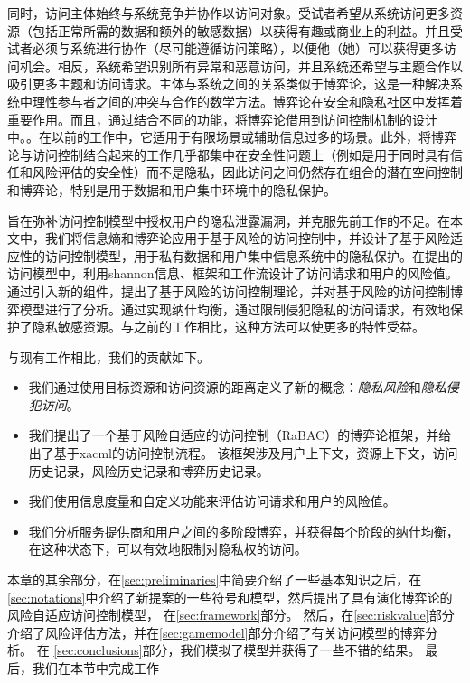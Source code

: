 同时，访问主体始终与系统竞争并协作以访问对象。受试者希望从系统访问更多资源（包括正常所需的数据和额外的敏感数据）以获得有趣或商业上的利益。并且受试者必须与系统进行协作（尽可能遵循访问策略），以便他（她）可以获得更多访问机会。相反，系统希望识别所有异常和恶意访问，并且系统还希望与主题合作以吸引更多主题和访问请求。主体与系统之间的关系类似于博弈论\cite{nash1950}，这是一种解决系统中理性参与者之间的冲突与合作的数学方法。博弈论在安全和隐私社区中发挥着重要作用\cite{do2017,zhu2018,tian2019}。而且，通过结合不同的功能，将博弈论借用到访问控制机制的设计中。\cite{hu2014,zhang2015,liu2016,gao2018, helil2017}。在以前的工作中，它适用于有限场景\cite{hu2014,gao2018}或辅助信息过多的场景\cite{zhang2015,liu2016,helil2017}。此外，将博弈论与访问控制结合起来的工作几乎都集中在安全性问题上（例如\cite{helil2017}是用于同时具有信任和风险评估的安全性）而不是隐私，因此访问之间仍然存在组合的潜在空间控制和博弈论，特别是用于数据和用户集中环境中的隐私保护。

旨在弥补访问控制模型中授权用户的隐私泄露漏洞，并克服先前工作的不足。在本文中，我们将信息熵和博弈论应用于基于风险的访问控制中，并设计了基于风险适应性的访问控制模型，用于私有数据和用户集中信息系统中的隐私保护。在提出的访问模型中，利用shannon信息、框架和工作流设计了访问请求和用户的风险值。通过引入新的组件，提出了基于风险的访问控制理论，并对基于风险的访问控制博弈模型进行了分析。通过实现纳什均衡，通过限制侵犯隐私的访问请求，有效地保护了隐私敏感资源。与之前的工作相比，这种方法可以使更多的特性受益。


与现有工作相比，我们的贡献如下。
\begin{itemize}
	
	\item 我们通过使用目标资源和访问资源的距离定义了新的概念：\textit{隐私风险}和\textit{隐私侵犯访问}。
	\item 我们提出了一个基于风险自适应的访问控制（RaBAC）的博弈论框架，并给出了基于xacml的访问控制流程。
	该框架涉及用户上下文，资源上下文，访问历史记录，风险历史记录和博弈历史记录。
	\item 我们使用信息度量和自定义功能来评估访问请求和用户的风险值。
	\item 我们分析服务提供商和用户之间的多阶段博弈，并获得每个阶段的纳什均衡，在这种状态下，可以有效地限制对隐私权的访问。
\end{itemize}


本章的其余部分，在\ref{sec:preliminaries}中简要介绍了一些基本知识之后，在\ref{sec:notations}中介绍了新提案的一些符号和模型，然后提出了具有演化博弈论的风险自适应访问控制模型， 在\ref{sec:framework}部分。 然后，在\ref{sec:riskvalue}部分介绍了风险评估方法，并在\ref{sec:gamemodel}部分介绍了有关访问模型的博弈分析。 在 \ref{sec:conclusions}部分，我们模拟了模型并获得了一些不错的结果。
最后，我们在本节中完成工作

